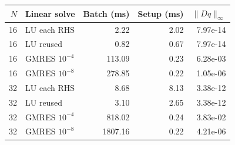 \begin{center}\small\begin{tabular}{rlrrr}\toprule
$N$ & Linear solve & Batch (ms) & Setup (ms) & $\|Dq\|_\infty$\\\midrule
16 & LU each RHS & 2.22 & 2.02 & 7.97e-14\\
16 & LU reused & 0.82 & 0.67 & 7.97e-14\\
16 & GMRES $10^{-4}$ & 113.09 & 0.23 & 6.28e-03\\
16 & GMRES $10^{-8}$ & 278.85 & 0.22 & 1.05e-06\\
32 & LU each RHS & 8.68 & 8.13 & 3.38e-12\\
32 & LU reused & 3.10 & 2.65 & 3.38e-12\\
32 & GMRES $10^{-4}$ & 818.02 & 0.24 & 3.83e-02\\
32 & GMRES $10^{-8}$ & 1807.16 & 0.22 & 4.21e-06\\
\bottomrule\end{tabular}\end{center}

